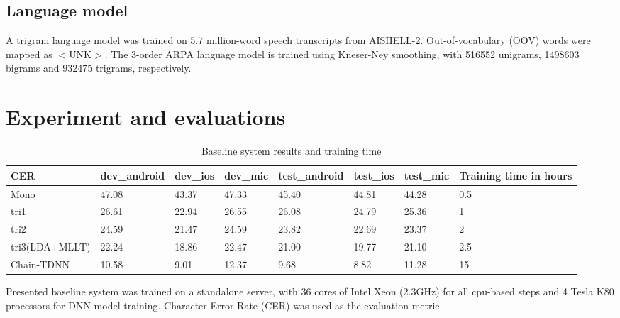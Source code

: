 \documentclass[a4paper]{article}
\begin{document}
\subsection{Language model}

A trigram language model was trained on 5.7 million-word speech transcripts from AISHELL-2. Out-of-vocabulary (OOV) words were mapped as $<$UNK$>$. The 3-order ARPA language model is trained using Kneser-Ney smoothing, with 516552 unigrams, 1498603 bigrams and 932475 trigrams, respectively.

\section{Experiment and evaluations}

\begin{table}[tp]
  \caption{Baseline system results and training time}
  \label{tab:base}
  \centering
  \begin{tabular}{ llllllll }
    \toprule
    CER               &  dev\_android           &  dev\_ios           &  dev\_mic           & test\_android            &  test\_ios           &  test\_mic          &  Training time in hours         \\
    \midrule
    Mono        &  47.08                 &  43.37             &  47.33             &  45.40                  &  44.81              &  44.28             &  0.5                   \\
    tri1    &  26.61                 &  22.94             &  26.55             &  26.08                  &  24.79              &  25.36             &  1                     \\
    tri2    &  24.59                 &  21.47             &  24.59             &  23.82                 &  22.69              &  23.37             &  2                     \\
    tri3(LDA+MLLT)          &  22.24                 &  18.86             &  22.47             &  21.00                  &  19.77              &  21.10             &  2.5                   \\
    Chain-TDNN              &  10.58                 &  9.01             &  12.37         &  9.68                  &  8.82             &  11.28              &  15                    \\
    \bottomrule
  \end{tabular}
\end{table}

Presented baseline system was trained on a standalone server, with 36 cores of Intel Xeon (2.3GHz) for all cpu-based steps and 4
Tesla K80 processors for DNN model training. Character Error Rate (CER) was used as the evaluation metric.
\end{document}

